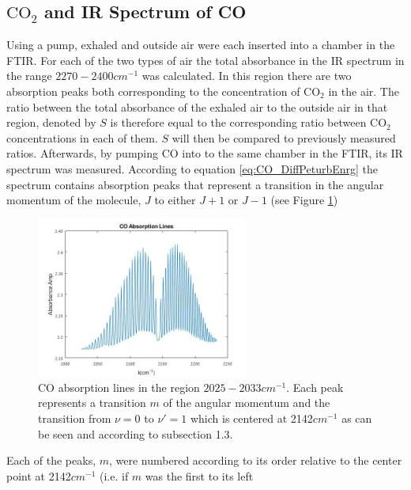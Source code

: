 \documentclass[reprint,amsmath,amssymb,aps, prl]{revtex4-2}
\begin{document}
\subsection{$\text{CO}_{2}$ and IR Spectrum of CO}
Using a pump, exhaled and outside air were each inserted into a chamber in the FTIR. For each of the two types of air the total absorbance in the IR spectrum in the range $2270-2400cm^{-1}$ was
calculated. In this region there are two absorption peaks both corresponding to the concentration of $\text{CO}_{2}$ in the air. The ratio between the total absorbance of the exhaled air to the outside air in that region, denoted by $S$ is therefore equal to the corresponding ratio between $\text{CO}_{2}$ concentrations in each of them. $S$ will then be compared to previously measured ratios. 
Afterwards, by pumping CO into to the same chamber in the FTIR, its IR spectrum was measured.
According to equation \ref{eq:CO_DiffPeturbEnrg}
the spectrum contains absorption peaks that represent a transition in the angular momentum of the molecule, $J$  to either $J+1$ or $J-1$ (see Figure \ref{fig:CoEnergy})
\begin{figure}[h]
    \includegraphics[width=7cm]{Images/COEnergystates.jpg}
    \caption{CO absorption lines in the region $2025-2033 cm^{-1}$. Each peak represents a transition $m$ of the angular momentum and the transition from $\nu=0$ to $\nu'=1$ which is centered at 2142$cm^{-1}$  as can be seen and according to subsection 1.3.
    }
    \label{fig:CoEnergy}
    \centering
\end{figure}
Each of the peaks, $m$, were numbered according to its order relative to the center point at 2142$cm^{-1}$ (i.e. if $m$ was the first to its left
\end{document}
